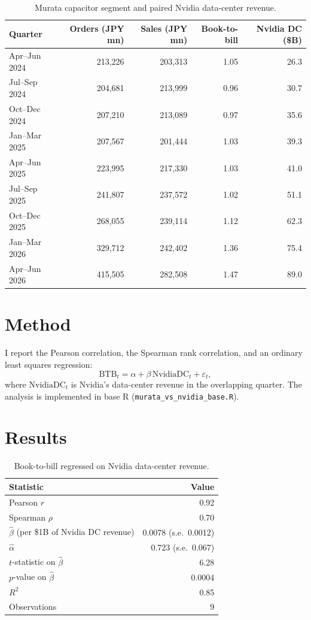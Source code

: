 \documentclass[11pt]{article}
\begin{document}
\begin{table}[h]
\centering
\begin{tabular}{lrrrr}
\toprule
Quarter & Orders (JPY mn) & Sales (JPY mn) & Book-to-bill & Nvidia DC (\$B) \\
\midrule
Apr--Jun 2024 & 213,226 & 203,313 & 1.05 & 26.3 \\
Jul--Sep 2024 & 204,681 & 213,999 & 0.96 & 30.7 \\
Oct--Dec 2024 & 207,210 & 213,089 & 0.97 & 35.6 \\
Jan--Mar 2025 & 207,567 & 201,444 & 1.03 & 39.3 \\
Apr--Jun 2025 & 223,995 & 217,330 & 1.03 & 41.0 \\
Jul--Sep 2025 & 241,807 & 237,572 & 1.02 & 51.1 \\
Oct--Dec 2025 & 268,055 & 239,114 & 1.12 & 62.3 \\
Jan--Mar 2026 & 329,712 & 242,402 & 1.36 & 75.4 \\
Apr--Jun 2026 & 415,505 & 282,508 & 1.47 & 89.0 \\
\bottomrule
\end{tabular}
\caption{Murata capacitor segment and paired Nvidia data-center revenue.}
\end{table}

\section{Method}
I report the Pearson correlation, the Spearman rank correlation, and an ordinary least squares
regression:
\begin{equation}
  \text{BTB}_t = \alpha + \beta\,\text{NvidiaDC}_t + \varepsilon_t ,
\end{equation}
where $\text{NvidiaDC}_t$ is Nvidia's data-center revenue in the overlapping quarter.
The analysis is implemented in base R (\texttt{murata\_vs\_nvidia\_base.R}).

\section{Results}
\begin{table}[h]
\centering
\begin{tabular}{lr}
\toprule
Statistic & Value \\
\midrule
Pearson $r$ & 0.92 \\
Spearman $\rho$ & 0.70 \\
$\hat\beta$ (per \$1B of Nvidia DC revenue) & 0.0078 (s.e.\ 0.0012) \\
$\hat\alpha$ & 0.723 (s.e.\ 0.067) \\
$t$-statistic on $\hat\beta$ & 6.28 \\
$p$-value on $\hat\beta$ & 0.0004 \\
$R^2$ & 0.85 \\
Observations & 9 \\
\bottomrule
\end{tabular}
\caption{Book-to-bill regressed on Nvidia data-center revenue.}
\end{table}
\end{document}
